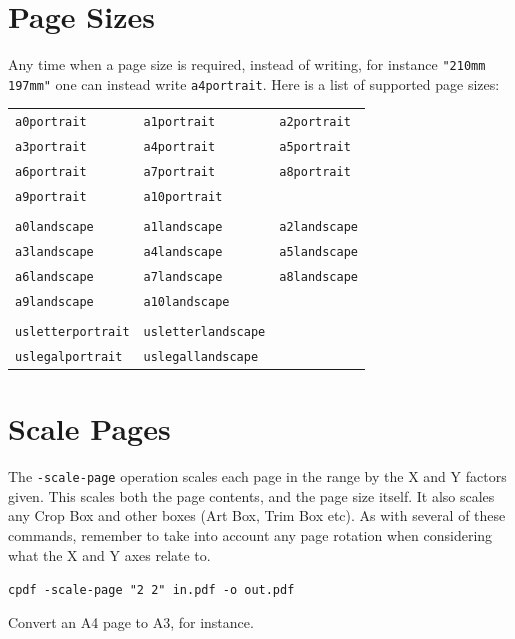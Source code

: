 \documentclass[a4paper,makeidx]{memoir}
\newcommand{\smallgap}{\vspace{4mm}}
\begin{document}
  \section{Page Sizes}
  Any time when a page size is required, instead of writing, for instance \texttt{"210mm 197mm"} one can instead write \texttt{a4portrait}. Here is a list of supported page sizes:

  \smallgap
  \begin{tabular}{lll}
  \texttt{a0portrait} & \texttt{a1portrait} & \texttt{a2portrait} \\
  \texttt{a3portrait} & \texttt{a4portrait} & \texttt{a5portrait} \\
  \texttt{a6portrait} & \texttt{a7portrait} & \texttt{a8portrait} \\
  \texttt{a9portrait} & \texttt{a10portrait} & \\
  \\
  \texttt{a0landscape} & \texttt{a1landscape} & \texttt{a2landscape} \\
  \texttt{a3landscape} & \texttt{a4landscape} & \texttt{a5landscape} \\
  \texttt{a6landscape} & \texttt{a7landscape} & \texttt{a8landscape} \\
  \texttt{a9landscape} & \texttt{a10landscape} & \\
  \\
  \texttt{usletterportrait} & \texttt{usletterlandscape} & \\
  \texttt{uslegalportrait} & \texttt{uslegallandscape} &
  \end{tabular}

  \section{Scale Pages}
  The \texttt{-scale-page} operation scales each page in the range by the X and
Y factors given. This scales both the page contents, and the page size itself. It also scales any Crop Box and other boxes (Art Box, Trim Box etc). As with several of these commands, remember to take into account any page rotation when considering what the X and Y axes relate to.

  \begin{framed}
  \small\noindent\verb!cpdf -scale-page "2 2" in.pdf -o out.pdf!

  \vspace{2.5mm}
  \noindent Convert an A4 page to A3, for instance.
  \end{framed}
\end{document}
